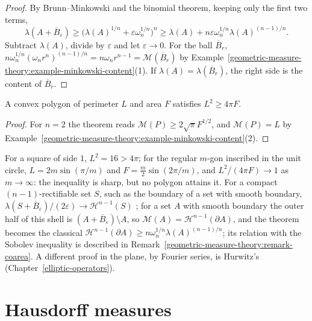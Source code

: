 \begin{proof}
By Brunn--Minkowski and the binomial theorem, keeping only the first two terms,
\[
\lambda(A + \overline{B}_\varepsilon) \geq \bigl(\lambda(A)^{1/n} + \varepsilon\omega_n^{1/n}\bigr)^n \geq \lambda(A) + n\varepsilon\omega_n^{1/n}\lambda(A)^{(n-1)/n}.
\]
Subtract $\lambda(A)$, divide by $\varepsilon$ and let $\varepsilon \to 0$. For the ball $\overline{B}_r$, $n\omega_n^{1/n}(\omega_nr^n)^{(n-1)/n} = n\omega_nr^{n-1} = \mathcal{M}(\overline{B}_r)$ by
Example~\ref{geometric-measure-theory:example-minkowski-content}(1). If $\lambda(A) = \lambda(\overline{B}_r)$, the right side is the content of $\overline{B}_r$.
\end{proof}

\begin{corollary}\label{geometric-measure-theory:corollary-isoperimetric-plane}
A convex polygon of perimeter $L$ and area $F$ satisfies $L^2 \geq 4\pi F$.
\end{corollary}

\begin{proof}
For $n = 2$ the theorem reads $\mathcal{M}(P) \geq 2\sqrt\pi F^{1/2}$, and $\mathcal{M}(P) = L$ by Example~\ref{geometric-measure-theory:example-minkowski-content}(2).
\end{proof}

For a square of side $1$, $L^2 = 16 > 4\pi$; for the regular $m$-gon inscribed in the unit circle, $L = 2m\sin(\pi/m)$ and $F = \frac m2\sin(2\pi/m)$, and $L^2/(4\pi F) \to 1$ as $m \to \infty$: the
inequality is sharp, but no polygon attains it. For a compact $(n-1)$-rectifiable set $S$, such as the boundary of a set with smooth boundary,
$\lambda(S + \overline{B}_\varepsilon)/(2\varepsilon) \to \mathcal{H}^{n-1}(S)$ \cite[3.2.39]{federer-gmt}; for a set $A$ with smooth boundary the outer half of this shell is $(A + \overline{B}_\varepsilon) \setminus A$,
so $\mathcal{M}(A) = \mathcal{H}^{n-1}(\partial A)$, and the theorem becomes the classical $\mathcal{H}^{n-1}(\partial A) \geq n\omega_n^{1/n}\lambda(A)^{(n-1)/n}$; its relation with the Sobolev inequality is described in Remark~\ref{geometric-measure-theory:remark-coarea}.
A different proof in the plane, by Fourier series, is Hurwitz's (Chapter~\ref{elliptic-operators}).

\section{Hausdorff measures}\label{geometric-measure-theory:section-hausdorff}

